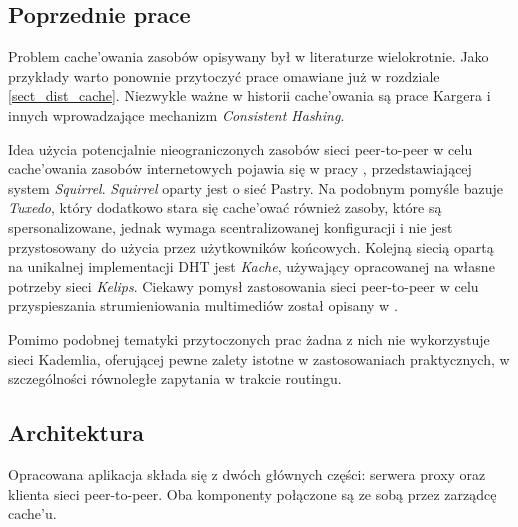 \documentclass[a4paper,11pt]{scrartcl}
\newcommand{\s}{ }
\newcommand{\keszu}{cache'u}
\newcommand{\keszowac}{cache'ować}
\newcommand{\keszowania}{cache'owania}
\begin{document}
\subsection{Poprzednie prace}
\label{sect_previous_work}
Problem \keszowania\s zasobów opisywany był w literaturze wielokrotnie. Jako przykłady warto ponownie przytoczyć prace \cite{malpani1995making, chankhunthod1995hierarchical, povey1997distributed} omawiane już w rozdziale \ref{sect_dist_cache}. Niezwykle ważne w historii \keszowania\s są prace Kargera i innych \cite{karger1997consistent, karger1999web} wprowadzające mechanizm \textit{Consistent Hashing}.

Idea użycia potencjalnie nieograniczonych zasobów sieci peer-to-peer w celu \keszowania\s zasobów internetowych pojawia się w pracy \cite{iyer2002squirrel, clevenot2004simple}, przedstawiającej system \textit{Squirrel}. \textit{Squirrel} oparty jest o sieć Pastry\cite{rowstron2001pastry}. 
Na podobnym pomyśle bazuje \textit{Tuxedo}\cite{shi2003tuxedo}, który dodatkowo stara się \keszowac\s również zasoby, które są spersonalizowane, jednak wymaga scentralizowanej konfiguracji i nie jest przystosowany do użycia przez użytkowników końcowych. 
Kolejną siecią opartą na unikalnej implementacji DHT jest \textit{Kache}\cite{linga2004kache}, używający opracowanej na własne potrzeby sieci \textit{Kelips}.
Ciekawy pomysł zastosowania sieci peer-to-peer w celu przyspieszania strumieniowania multimediów został opisany w \cite{guo2006design}.

Pomimo podobnej tematyki przytoczonych prac żadna z nich nie wykorzystuje sieci Kademlia, oferującej pewne zalety istotne w zastosowaniach praktycznych, w szczególności równoległe zapytania w trakcie routingu.

\subsection{Architektura}
\label{sect_architecture}
Opracowana aplikacja składa się z dwóch głównych części: serwera proxy oraz klienta sieci peer-to-peer. Oba komponenty połączone są ze sobą przez zarządcę \keszu.
\end{document}
